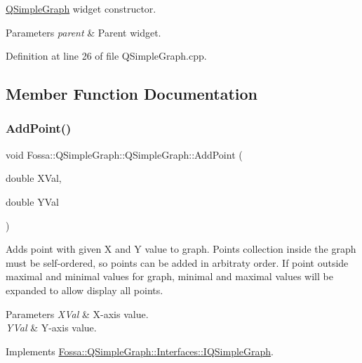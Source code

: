 \hyperlink{class_fossa_1_1_q_simple_graph_1_1_q_simple_graph}{Q\+Simple\+Graph} widget constructor. 


\begin{DoxyParams}{Parameters}
{\em parent} & Parent widget. \\
\hline
\end{DoxyParams}


Definition at line 26 of file Q\+Simple\+Graph.\+cpp.



\subsection{Member Function Documentation}
\mbox{\label{class_fossa_1_1_q_simple_graph_1_1_q_simple_graph_a39fdbd2aa624b7b086b5761308d8d49c}} 
\subsubsection{\texorpdfstring{Add\+Point()}{AddPoint()}}
{\footnotesize\ttfamily void Fossa\+::\+Q\+Simple\+Graph\+::\+Q\+Simple\+Graph\+::\+Add\+Point (\begin{DoxyParamCaption}\item[{double}]{X\+Val,  }\item[{double}]{Y\+Val }\end{DoxyParamCaption})\hspace{0.3cm}{\ttfamily [virtual]}}



Adds point with given X and Y value to graph. Points collection inside the graph must be self-\/ordered, so points can be added in arbitraty order. If point outside maximal and minimal values for graph, minimal and maximal values will be expanded to allow display all points. 


\begin{DoxyParams}{Parameters}
{\em X\+Val} & X-\/axis value. \\
\hline
{\em Y\+Val} & Y-\/axis value. \\
\hline
\end{DoxyParams}


Implements \hyperlink{class_fossa_1_1_q_simple_graph_1_1_interfaces_1_1_i_q_simple_graph_a5d43e4e0f06bedb1734e4240070fe229}{Fossa\+::\+Q\+Simple\+Graph\+::\+Interfaces\+::\+I\+Q\+Simple\+Graph}.



